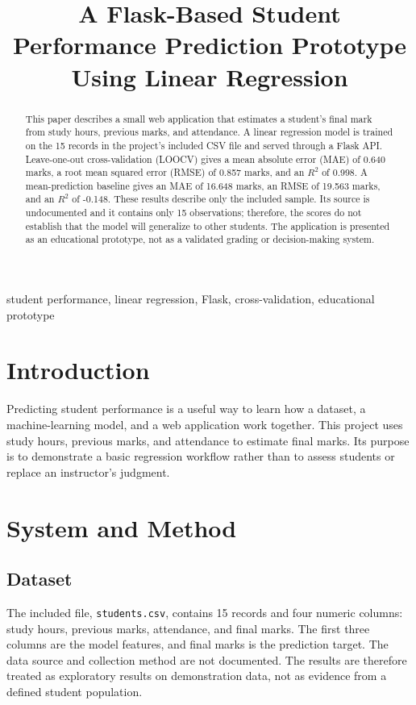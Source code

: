 \documentclass[conference]{IEEEtran}
\begin{document}
\title{A Flask-Based Student Performance Prediction Prototype Using Linear Regression}

\author{
}

\maketitle

\begin{abstract}
This paper describes a small web application that estimates a student's final
mark from study hours, previous marks, and attendance. A linear regression
model is trained on the 15 records in the project's included CSV file and
served through a Flask API. Leave-one-out cross-validation (LOOCV) gives a
mean absolute error (MAE) of 0.640 marks, a root mean squared error (RMSE) of
0.857 marks, and an $R^2$ of 0.998. A mean-prediction baseline gives an MAE of
16.648 marks, an RMSE of 19.563 marks, and an $R^2$ of -0.148. These results
describe only the included sample. Its source is undocumented and it contains
only 15 observations; therefore, the scores do not establish that the model
will generalize to other students. The application is presented as an
educational prototype, not as a validated grading or decision-making system.
\end{abstract}

\begin{IEEEkeywords}
student performance, linear regression, Flask, cross-validation, educational
prototype
\end{IEEEkeywords}

\section{Introduction}
Predicting student performance is a useful way to learn how a dataset, a
machine-learning model, and a web application work together. This project
uses study hours, previous marks, and attendance to estimate final marks.
Its purpose is to demonstrate a basic regression workflow rather than to
assess students or replace an instructor's judgment.

\section{System and Method}
\subsection{Dataset}
The included file, \texttt{students.csv}, contains 15 records and four numeric
columns: study hours, previous marks, attendance, and final marks. The first
three columns are the model features, and final marks is the prediction
target. The data source and collection method are not documented. The results
are therefore treated as exploratory results on demonstration data, not as
evidence from a defined student population.
\end{document}
